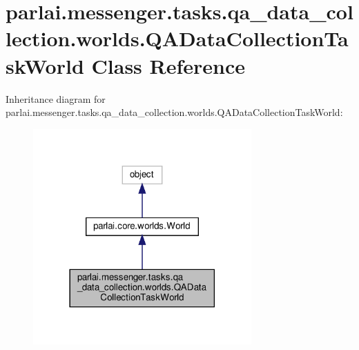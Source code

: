 \hypertarget{classparlai_1_1messenger_1_1tasks_1_1qa__data__collection_1_1worlds_1_1QADataCollectionTaskWorld}{}\section{parlai.\+messenger.\+tasks.\+qa\+\_\+data\+\_\+collection.\+worlds.\+Q\+A\+Data\+Collection\+Task\+World Class Reference}
\label{classparlai_1_1messenger_1_1tasks_1_1qa__data__collection_1_1worlds_1_1QADataCollectionTaskWorld}


Inheritance diagram for parlai.\+messenger.\+tasks.\+qa\+\_\+data\+\_\+collection.\+worlds.\+Q\+A\+Data\+Collection\+Task\+World\+:
\nopagebreak
\begin{figure}[H]
\begin{center}
\leavevmode
\includegraphics[width=237pt]{classparlai_1_1messenger_1_1tasks_1_1qa__data__collection_1_1worlds_1_1QADataCollectionTaskWorld__inherit__graph}
\end{center}
\end{figure}


